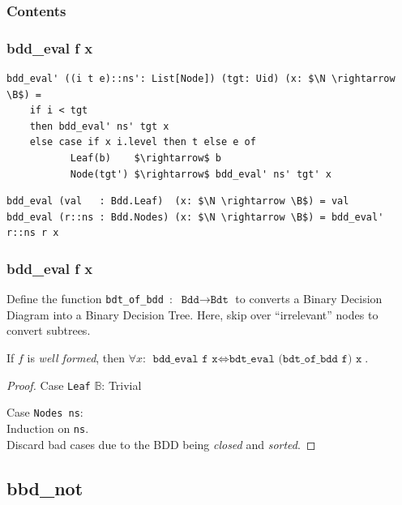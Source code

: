 \documentclass[english, aspectratio=169]{beamer}
\newcommand{\B}[0]{\ensuremath{\mathbb{B}}}
\begin{document}
\begin{frame}{}
  \frametitle{Contents}
\end{frame}

\begin{frame}[fragile]
  \frametitle{bdd\_eval f x}

  \begin{lstlisting}
bdd_eval' ((i t e)::ns': List[Node]) (tgt: Uid) (x: $\N \rightarrow \B$) =
    if i < tgt
    then bdd_eval' ns' tgt x
    else case if x i.level then t else e of
           Leaf(b)    $\rightarrow$ b
           Node(tgt') $\rightarrow$ bdd_eval' ns' tgt' x
   \end{lstlisting}
   \begin{lstlisting}[firstnumber=7]
bdd_eval (val   : Bdd.Leaf)  (x: $\N \rightarrow \B$) = val
bdd_eval (r::ns : Bdd.Nodes) (x: $\N \rightarrow \B$) = bdd_eval' r::ns r x
  \end{lstlisting}
\end{frame}

\begin{frame}
  \frametitle{bdd\_eval f x}

  Define the function \texttt{bdt\_of\_bdd}~:~$\texttt{Bdd} \rightarrow \texttt{Bdt}$ to converts a
  Binary Decision Diagram into a Binary Decision Tree. Here, skip over ``irrelevant'' nodes to
  convert subtrees.

  \pause

  \begin{theorem}
    If $f$ is \emph{well formed}, then $\forall x$:
    $\texttt{bdd\_eval f x} \iff \texttt{bdt\_eval (bdt\_of\_bdd f) x}$.
  \end{theorem}
  \begin{proof}
    Case \texttt{Leaf} $\B$: Trivial

    Case \texttt{Nodes ns}:\\
    \quad Induction on \texttt{ns}.\\
    \quad Discard bad cases due to the BDD being \emph{closed} and \emph{sorted}.
  \end{proof}
\end{frame}

\subsection{bbd\_not}
\end{document}
